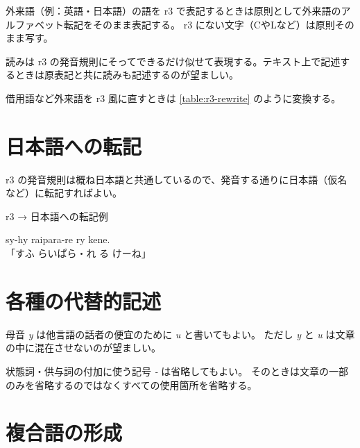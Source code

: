 外来語（例：英語・日本語）の語を r3 で表記するときは原則として外来語のアルファベット転記をそのまま表記する。
r3 にない文字（CやLなど）は原則そのまま写す。

読みは r3 の発音規則にそってできるだけ似せて表現する。テキスト上で記述するときは原表記と共に読みも記述するのが望ましい。

借用語など外来語を r3 風に直すときは \cref{table:r3-rewrite} のように変換する。

\section{日本語への転記}

r3 の発音規則は概ね日本語と共通しているので、発音する通りに日本語（仮名など）に転記すればよい。

\begin{itembox}[l]{r3 → 日本語への転記例}
    \begin{pindent}
        \noindent
        sy-hy raipara-re ry kene. \\
        「すふ らいぱら・れ る けーね」
    \end{pindent}
\end{itembox}

\section{各種の代替的記述}

母音 \emph{y} は他言語の話者の便宜のために \emph{u} と書いてもよい。
ただし \emph{y} と \emph{u} は文章の中に混在させないのが望ましい。

状態詞・供与詞の付加に使う記号 \emph{-} は省略してもよい。
そのときは文章の一部のみを省略するのではなくすべての使用箇所を省略する。

\section{複合語の形成}